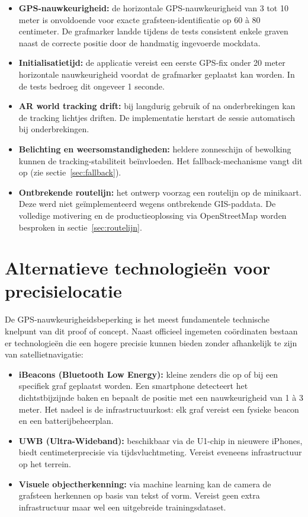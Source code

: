 \begin{itemize}
    \item \textbf{GPS-nauwkeurigheid:} de horizontale GPS-nauwkeurigheid van 3 tot 10 meter is onvoldoende voor exacte grafsteen-identificatie op 60 à 80 centimeter. De grafmarker landde tijdens de tests consistent enkele graven naast de correcte positie door de handmatig ingevoerde mockdata.
    
    \item \textbf{Initialisatietijd:} de applicatie vereist een eerste GPS-fix onder 20 meter horizontale nauwkeurigheid voordat de grafmarker geplaatst kan worden. In de tests bedroeg dit ongeveer 1 seconde.
    
    \item \textbf{AR world tracking drift:} bij langdurig gebruik of na onderbrekingen kan de tracking lichtjes driften. De implementatie herstart de sessie automatisch bij onderbrekingen.
    
    \item \textbf{Belichting en weersomstandigheden:} heldere zonneschijn of bewolking kunnen de tracking-stabiliteit beïnvloeden. Het fallback-mechanisme vangt dit op (zie sectie~\ref{sec:fallback}).
    
    \item \textbf{Ontbrekende routelijn:} het ontwerp voorzag een routelijn op de minikaart. Deze werd niet geïmplementeerd wegens ontbrekende GIS-paddata. De volledige motivering en de productieoplossing via OpenStreetMap worden besproken in sectie~\ref{sec:routelijn}.
\end{itemize}

\section{Alternatieve technologieën voor precisielocatie}
\label{sec:precisielocatie}

De GPS-nauwkeurigheidsbeperking is het meest fundamentele technische knelpunt van dit proof of concept. Naast officieel ingemeten coördinaten bestaan er technologieën die een hogere precisie kunnen bieden zonder afhankelijk te zijn van satellietnavigatie:

\begin{itemize}
    \item \textbf{iBeacons (Bluetooth Low Energy):} kleine zenders die op of bij een specifiek graf geplaatst worden. Een smartphone detecteert het dichtstbijzijnde baken en bepaalt de positie met een nauwkeurigheid van 1 à 3 meter. Het nadeel is de infrastructuurkost: elk graf vereist een fysieke beacon en een batterijbeheerplan.
    
    \item \textbf{UWB (Ultra-Wideband):} beschikbaar via de U1-chip in nieuwere iPhones, biedt centimeterprecisie via tijdsvluchtmeting. Vereist eveneens infrastructuur op het terrein.
    
    \item \textbf{Visuele objectherkenning:} via machine learning kan de camera de grafsteen herkennen op basis van tekst of vorm. Vereist geen extra infrastructuur maar wel een uitgebreide trainingsdataset.
\end{itemize}

